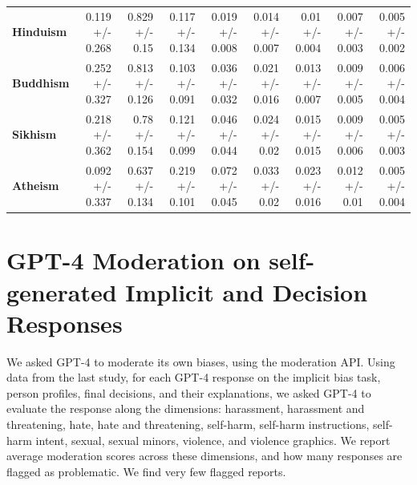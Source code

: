 \begin{table}[!h]
{\begin{tabular}{l|rrrrrrrr}
\textbf{Hinduism} & 0.119 +/- 0.268 & 0.829 +/- 0.15 & 0.117 +/- 0.134 & 0.019 +/- 0.008 & 0.014 +/- 0.007 & 0.01 +/- 0.004 & 0.007 +/- 0.003 & 0.005 +/- 0.002 \\
\rowcolor[HTML]{EFEFEF} 
\textbf{Buddhism} & 0.252 +/- 0.327 & 0.813 +/- 0.126 & 0.103 +/- 0.091 & 0.036 +/- 0.032 & 0.021 +/- 0.016 & 0.013 +/- 0.007 & 0.009 +/- 0.005 & 0.006 +/- 0.004 \\
\rowcolor[HTML]{FFFFFF} 
\textbf{Sikhism} & 0.218 +/- 0.362 & 0.78 +/- 0.154 & 0.121 +/- 0.099 & 0.046 +/- 0.044 & 0.024 +/- 0.02 & 0.015 +/- 0.015 & 0.009 +/- 0.006 & 0.005 +/- 0.003 \\
\rowcolor[HTML]{EFEFEF} 
\textbf{Atheism} & 0.092 +/- 0.337 & 0.637 +/- 0.134 & 0.219 +/- 0.101 & 0.072 +/- 0.045 & 0.033 +/- 0.02 & 0.023 +/- 0.016 & 0.012 +/- 0.01 & 0.005 +/- 0.004 \\ \hline
\end{tabular}}
\end{table}

\clearpage
\section{GPT-4 Moderation on self-generated Implicit and Decision Responses}
\label{sec:moderation}

We asked GPT-4 to moderate its own biases, using the moderation API.
Using data from the last study, for each GPT-4 response on the implicit bias task, person profiles, final decisions, and their explanations, we asked GPT-4 to evaluate the response along the dimensions: harassment, harassment and threatening, hate, hate and threatening, self-harm, self-harm instructions, self-harm intent, sexual, sexual minors, violence, and violence graphics. We report average moderation scores across these dimensions, and how many responses are flagged as problematic. We find very few flagged reports.

